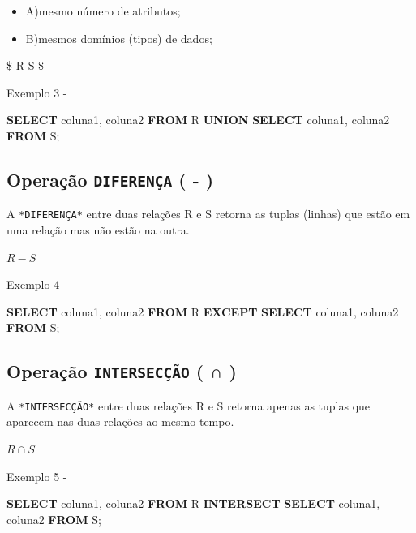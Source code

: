 \documentclass[
]{book}
\newenvironment{Shaded}{\begin{snugshade}}{\end{snugshade}}
\newcommand{\KeywordTok}[1]{\textcolor[rgb]{0.13,0.29,0.53}{\textbf{#1}}}
\newcommand{\NormalTok}[1]{#1}
\providecommand{\tightlist}{%
  \setlength{\itemsep}{0pt}\setlength{\parskip}{0pt}}
\begin{document}
\begin{itemize}
\tightlist
\item
  A)mesmo número de atributos;
\item
  B)mesmos domínios (tipos) de dados;
\end{itemize}

\$ R \cup S \$

Exemplo 3 -

\begin{Shaded}
\begin{Highlighting}[]
\KeywordTok{SELECT}\NormalTok{ coluna1, coluna2 }\KeywordTok{FROM}\NormalTok{ R}
\KeywordTok{UNION}
\KeywordTok{SELECT}\NormalTok{ coluna1, coluna2 }\KeywordTok{FROM}\NormalTok{ S;}
\end{Highlighting}
\end{Shaded}

\subsection{\texorpdfstring{Operação \texttt{DIFERENÇA} ( - )}{Operação DIFERENÇA ( - )}}\label{operauxe7uxe3o-diferenuxe7a--}

A \texttt{*DIFERENÇA*} entre duas relações R e S retorna as tuplas (linhas) que estão em uma relação mas não estão na outra.

\(R - S\)

Exemplo 4 -

\begin{Shaded}
\begin{Highlighting}[]
\KeywordTok{SELECT}\NormalTok{ coluna1, coluna2 }\KeywordTok{FROM}\NormalTok{ R}
\KeywordTok{EXCEPT}
\KeywordTok{SELECT}\NormalTok{ coluna1, coluna2 }\KeywordTok{FROM}\NormalTok{ S;}
\end{Highlighting}
\end{Shaded}

\subsection{\texorpdfstring{Operação \texttt{INTERSECÇÃO} ( ∩ )}{Operação INTERSECÇÃO ( ∩ )}}\label{operauxe7uxe3o-intersecuxe7uxe3o}

A \texttt{*INTERSECÇÃO*} entre duas relações R e S retorna apenas as tuplas que aparecem nas duas relações ao mesmo tempo.

\(R \cap S\)

Exemplo 5 -

\begin{Shaded}
\begin{Highlighting}[]
\KeywordTok{SELECT}\NormalTok{ coluna1, coluna2 }\KeywordTok{FROM}\NormalTok{ R}
\KeywordTok{INTERSECT}
\KeywordTok{SELECT}\NormalTok{ coluna1, coluna2 }\KeywordTok{FROM}\NormalTok{ S;}
\end{Highlighting}
\end{Shaded}
\end{document}
